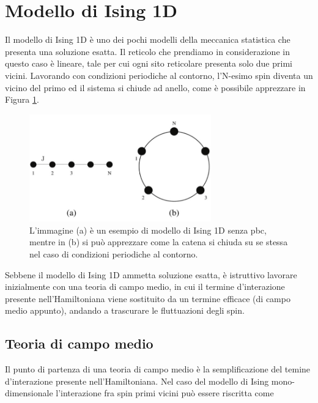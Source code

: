 \section{Modello di Ising 1D}

Il modello di Ising 1D è uno dei pochi modelli della meccanica statistica che presenta una soluzione esatta.
Il reticolo che prendiamo in considerazione in questo caso è lineare, tale per cui ogni sito reticolare presenta 
solo due primi vicini. Lavorando con condizioni periodiche al contorno, l'N-esimo spin diventa un vicino del 
primo ed il sistema si chiude ad anello, come è possibile apprezzare in Figura \ref{fig: Ising1D_pbc}.

\begin{figure}[h!]
    \centering
    \includegraphics[width=0.7\textwidth]{Immagini/Ising1D_pbc.png}
    \caption{L'immagine (a) è un esempio di modello di Ising 1D senza pbc, mentre in (b) si può apprezzare 
    come la catena si chiuda su se stessa nel caso di condizioni periodiche al contorno. }
    \label{fig: Ising1D_pbc}
\end{figure}

Sebbene il modello di Ising 1D ammetta soluzione esatta, è istruttivo lavorare inizialmente con una teoria di campo 
medio, in cui il termine d'interazione presente nell'Hamiltoniana viene sostituito da un termine efficace (di campo 
medio appunto), andando a trascurare le fluttuazioni degli spin.





\subsection{Teoria di campo medio}

Il punto di partenza di una teoria di campo medio è la semplificazione del temine d'interazione presente nell'Hamiltoniana. Nel  
caso del modello di Ising mono-dimensionale l'interazione fra spin primi vicini può essere riscritta come

